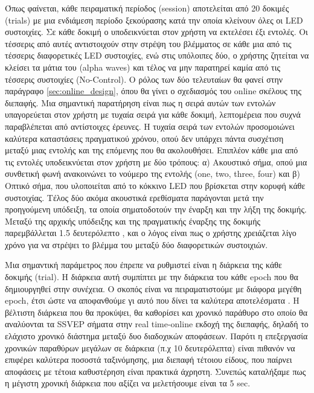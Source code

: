 \documentclass[11pt,a4paper,english,greek,twoside]{../Thesis}
\begin{document}
\par Όπως φαίνεται, κάθε πειραματική περίοδος (session) αποτελείται από 20 δοκιμές (trials) με μια ενδιάμεση περίοδο ξεκούρασης κατά την οποία κλείνουν όλες οι LED συστοιχίες. Σε κάθε δοκιμή ο υποδεικνύεται στον χρήστη να εκτελέσει έξι εντολές. Οι τέσσερις από αυτές αντιστοιχούν στην στρέψη του βλέμματος σε κάθε μια από τις τέσσερις διαφορετικές LED συστοιχίες, ενώ στις υπόλοιπες δύο, ο χρήστης ζητείται να κλείσει τα μάτια του (alpha waves) και τέλος να μην παρατηρεί καμία από τις τέσσερις συστοιχίες (No-Control). Ο ρόλος των δύο τελευταίων θα φανεί στην παράγραφο \ref{sec:online_design}, όπου θα γίνει ο σχεδιασμός του online σκέλους της διεπαφής. Μια σημαντική παρατήρηση είναι πως η σειρά αυτών των εντολών υπαγορεύεται στον χρήστη με τυχαία σειρά για κάθε δοκιμή, λεπτομέρεια που συχνά παραβλέπεται από αντίστοιχες έρευνες. Η τυχαία σειρά των εντολών προσομοιώνει καλύτερα καταστάσεις πραγματικού χρόνου, οπού δεν υπάρχει πάντα συσχέτιση μεταξύ μιας εντολής και της επόμενης που θα ακολουθήσει. Επιπλέον κάθε μια από τις εντολές υποδεικνύεται στον χρήστη με δύο τρόπους: α) Ακουστικό σήμα, οπού μια συνθετική φωνή ανακοινώνει το νούμερο της εντολής (one, two, three, four) και β) Οπτικό σήμα, που υλοποιείται από το κόκκινο LED που βρίσκεται στην κορυφή κάθε συστοιχίας. Τέλος δύο ακόμα ακουστικά ερεθίσματα παράγονται μετά την προηγούμενη υπόδειξη, τα οποία σηματοδοτούν την έναρξη και την λήξη της δοκιμής. Μεταξύ της αρχικής υπόδειξης και της πραγματικής έναρξης της δοκιμής παρεμβάλλεται 1.5 δευτερόλεπτο , και ο λόγος είναι πως ο χρήστης χρειάζεται λίγο χρόνο για να στρέψει το βλέμμα του μεταξύ δύο διαφορετικών συστοιχιών.

\par Μια σημαντική παράμετρος που έπρεπε να ρυθμιστεί είναι η διάρκεια της κάθε δοκιμής (trial). Η διάρκεια αυτή συμπίπτει με την διάρκεια του κάθε epoch που θα δημιουργηθεί στην συνέχεια. Ο σκοπός είναι να πειραματιστούμε με διάφορα μεγέθη epoch, έτσι ώστε να αποφανθούμε γι αυτό που δίνει τα καλύτερα αποτελέσματα . Η βέλτιστη διάρκεια που θα προκύψει, θα καθορίσει και χρονικό παράθυρο στο οποίο θα αναλύονται τα SSVEP σήματα στην real time-online εκδοχή της διεπαφής, δηλαδή το ελάχιστο χρονικό διάστημα μεταξύ δυο διαδοχικών αποφάσεων. Παρότι η επεξεργασία χρονικών παραθύρων μεγάλων σε διάρκεια (π.χ 10 δευτερόλεπτα) είναι πιθανόν να επιφέρει καλύτερα ποσοστά ταξινόμησης, μια διεπαφή τέτοιου είδους, που παίρνει αποφάσεις με τέτοια καθυστέρηση είναι πρακτικά άχρηστη. Συνεπώς καταλήξαμε πως η μέγιστη χρονική διάρκεια που αξίζει να μελετήσουμε είναι τα 5 sec. 
\end{document}
